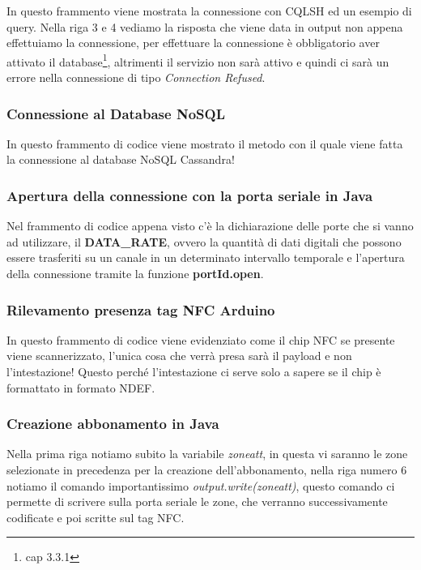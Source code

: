 In questo frammento viene mostrata la connessione con CQLSH ed un esempio di query. Nella riga 3 e 4 vediamo la risposta che viene data in output non appena effettuiamo la connessione, per effettuare la connessione è obbligatorio aver attivato il database\footnote{cap 3.3.1 }, altrimenti il servizio non sarà attivo e quindi ci sarà un errore nella connessione di tipo \textit{Connection Refused}.
\bigskip\subsubsection{Connessione al Database NoSQL}


In questo frammento di codice viene mostrato il metodo con il quale viene fatta la connessione al database NoSQL Cassandra!
\subsubsection{Apertura della connessione con la porta seriale in Java}


Nel frammento di codice appena visto c'è la dichiarazione delle porte che si vanno ad utilizzare, il \textbf{DATA\_RATE}, ovvero la quantità di dati digitali che possono essere trasferiti su un canale in un determinato intervallo temporale e l'apertura della connessione tramite la funzione \textbf{portId.open}.
\subsubsection{Rilevamento presenza tag NFC Arduino}


In questo frammento di codice viene evidenziato come il chip NFC se presente viene scannerizzato, l'unica cosa che verrà presa sarà il payload e non l'intestazione! Questo perché l'intestazione ci serve solo a sapere se il chip è formattato in formato NDEF.
\subsubsection{Creazione abbonamento in Java}


Nella prima riga notiamo subito la variabile \textit{zoneatt}, in questa vi saranno le zone selezionate in precedenza per la creazione dell'abbonamento, nella riga numero 6 notiamo il comando importantissimo \textit{output.write(zoneatt)}, questo comando ci permette di scrivere sulla porta seriale le zone, che verranno successivamente codificate e poi scritte sul tag NFC.
